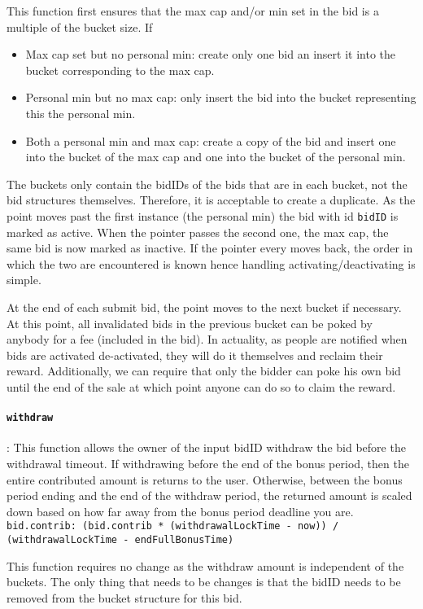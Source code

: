 \documentclass{article}
\begin{document}
{\color{red} This function first ensures that the max cap and/or min set in the bid is a multiple of the bucket size.
If
\begin{itemize}
    \item Max cap set but no personal min: create only one bid an insert it into the bucket corresponding to the max cap.
    \item Personal min but no max cap: only insert the bid into the bucket representing this the personal min.
    \item Both a personal min and max cap: create a copy of the bid and insert one into the bucket of the max cap and one into the bucket of the personal min.
\end{itemize}

The buckets only contain the bidIDs of the bids that are in each bucket, not the bid structures themselves. Therefore, it is acceptable to create a duplicate.
As the point moves past the first instance (the personal min) the bid with id \texttt{bidID} is marked as active.
When the pointer passes the second one, the max cap, the same bid is now marked as inactive.
If the pointer every moves back, the order in which the two are encountered is known hence handling activating/deactivating is simple.

At the end of each submit bid, the point moves to the next bucket if necessary. 
At this point, all invalidated bids in the previous bucket can be poked by anybody for a fee (included in the bid).
In actuality, as people are notified when bids are activated de-activated, they will do it themselves and reclaim their reward.
Additionally, we can require that only the bidder can poke his own bid until the end of the sale at which point anyone can do so to claim the reward.
}

\paragraph{\texttt{withdraw}}: 
This function allows the owner of the input bidID withdraw the bid before the withdrawal timeout.
If withdrawing before the end of the bonus period, then the entire contributed amount is returns to the user.
Otherwise, between the bonus period ending and the end of the withdraw period, the returned amount is scaled down based on how far away from the bonus period deadline you are.
\texttt{bid.contrib: (bid.contrib * (withdrawalLockTime - now)) / (withdrawalLockTime - endFullBonusTime)}

{ \color{red}
This function requires no change as the withdraw amount is independent of the buckets.
The only thing that needs to be changes is that the bidID needs to be removed from the bucket structure for this bid.
}
\end{document}
